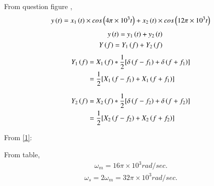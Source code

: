 \documentclass[beamer]{IEEEtran}
\theoremstyle{remark}
\begin{document}
 From question figure ,
\begin{align}
y\left(t\right)=x_1\left(t\right)\times cos\left(4\pi\times10^3t\right)+x_2\left(t\right)\times cos\left(12\pi\times10^3t\right)
\end{align}
\begin{align}
	y\left(t\right)=y_1\left(t\right)+y_2\left(t\right)\\
	Y\left(f\right)=Y_1\left(f\right)+Y_2\left(f\right)\label{1}
\end{align}
\begin{align}
	Y_1\left(f\right)&=X_1\left(f\right)*\frac{1}{2}[\delta\left(f-f_1\right)+\delta\left(f+f_1\right)]\\
	      &=\frac{1}{2}[X_1\left(f-f_1\right)+X_1\left(f+f_1\right)]
\end{align}
\begin{figure}[ht]
    \centering
	
    
	
    \label{fig:EC50.4}
\end{figure} 

\begin{align}
	Y_2\left(f\right)&=X_2\left(f\right)*\frac{1}{2}[\delta\left(f-f_2\right)+\delta\left(f+f_2\right)]\\ 
	&=\frac{1}{2}[X_2\left(f-f_2\right)+X_2\left(f+f_2\right)]
\end{align}
\clearpage

\begin{figure}[ht]
    \centering
	
    
	
    \label{fig:EC50.5}
\end{figure} 

From \eqref{1}:
\begin{figure}[ht]
    \centering
	
    
	
    \label{fig:EC50.6}
\end{figure} 

From table,
\begin{align}
\omega_{m}=16\pi\times10^3 rad/sec.
\end{align}
\begin{align}
\omega_{s}=2\omega_{m}=32\pi\times10^3 rad/sec.
\end{align}
\end{document}
